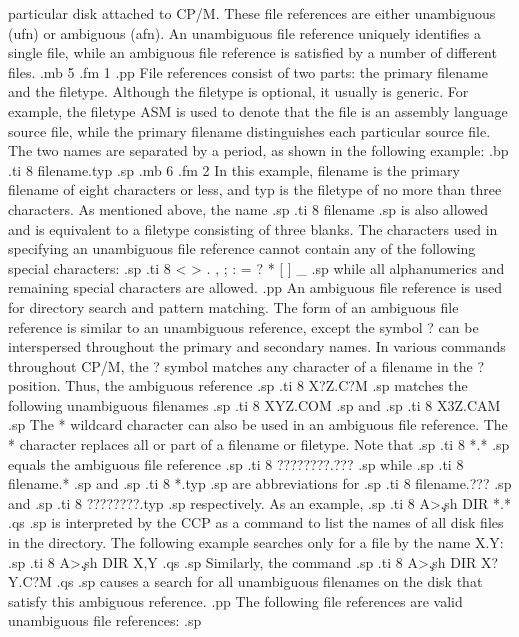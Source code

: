 particular disk attached to CP/M.  These file references are
either unambiguous (ufn) or ambiguous (afn).  An unambiguous file
reference uniquely identifies a single file, while an ambiguous file
reference is satisfied by a number of different files.
.mb 5
.fm 1
.pp
File references consist of two parts:  the primary filename and the
filetype.  Although the filetype is optional, it usually is 
generic.  For example, the filetype ASM is used to denote that the file is an
assembly language source file, while the primary filename distinguishes each
particular source file.  The two names are separated by a period, as shown
in the following example:
.bp
.ti 8
filename.typ
.sp
.mb 6
.fm 2
In this example, filename is the primary filename of eight characters or
less, and typ
is the filetype of no more than three characters.  As mentioned above, the
name
.sp
.ti 8
filename
.sp
is also allowed and is equivalent to a filetype consisting of 
three blanks.  The characters used in specifying an unambiguous 
file reference cannot contain any of the following special 
characters:
.sp
.ti 8
< > . , ; : = ? * [ ] _ %
.sp
while all alphanumerics and remaining special characters are allowed.
.pp
An ambiguous file reference is used for directory search and pattern
matching.  The form of an ambiguous file reference is similar to an
unambiguous reference, except the symbol ? can be interspersed throughout
the primary and secondary names.  In various commands throughout CP/M,
the ? symbol matches any character of a filename in the ? position.
Thus, the ambiguous reference
.sp
.ti 8
X?Z.C?M
.sp
matches the following unambiguous filenames
.sp
.ti 8
XYZ.COM
.sp
and
.sp
.ti 8
X3Z.CAM
.sp
The * wildcard character can also be used in an ambiguous file 
reference.  The * character replaces all or part of a filename or 
filetype.  Note that
.sp
.ti 8
*.*
.sp
equals the ambiguous file reference
.sp
.ti 8
????????.???
.sp
while
.sp
.ti 8
filename.*
.sp
and
.sp
.ti 8
*.typ
.sp
are abbreviations for
.sp
.ti 8
filename.???
.sp
and
.sp
.ti 8
????????.typ
.sp
respectively.  As an example,
.sp
.ti 8
A>\c
.sh
DIR *.*
.qs
.sp
is interpreted by the CCP as a command to list the names of all disk files
in the directory.  The following example searches only for a file 
by the name X.Y:
.sp
.ti 8
A>\c
.sh
DIR X,Y
.qs
.sp
Similarly, the command
.sp
.ti 8
A>\c
.sh
DIR X?Y.C?M
.qs
.sp
causes a search for all unambiguous filenames on the disk that satisfy
this ambiguous reference.
.pp
The following file references are valid unambiguous file references:
.sp
